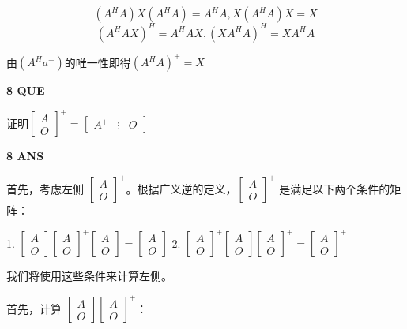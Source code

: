 \documentclass[11pt,letterpaper]{ctexart}
\begin{document}
\begin{enumerate}
\[ (A^{H}A)X(A^{H}A) = A^{H}A, X (A^{H}A)X = X \]
\[(A^{H}AX)^H = A^{H}AX, (XA^{H}A)^H = XA^{H}A \]


由$(A^Ha^{+})$的唯一性即得$(A^HA)^{+} = X$


\textbf{8 QUE}
\bigskip

证明$\begin{bmatrix}
	A \\
	O
\end{bmatrix}^{+} = \begin{bmatrix}
	A^{+} & \vdots & O
\end{bmatrix}$


\textbf{8 ANS}
\bigskip


首先，考虑左侧 $\begin{bmatrix} A \\ O \end{bmatrix}^+$。根据广义逆的定义，$\begin{bmatrix} A \\ O \end{bmatrix}^+$ 是满足以下两个条件的矩阵：

1. $\begin{bmatrix} A \\ O \end{bmatrix} \begin{bmatrix} A \\ O \end{bmatrix}^+ \begin{bmatrix} A \\ O \end{bmatrix} = \begin{bmatrix} A \\ O \end{bmatrix}$
2. $\begin{bmatrix} A \\ O \end{bmatrix}^+ \begin{bmatrix} A \\ O \end{bmatrix} \begin{bmatrix} A \\ O \end{bmatrix}^+ = \begin{bmatrix} A \\ O \end{bmatrix}^+$

我们将使用这些条件来计算左侧。

首先，计算 $\begin{bmatrix} A \\ O \end{bmatrix} \begin{bmatrix} A \\ O \end{bmatrix}^+$：


\end{enumerate}
\end{document}
